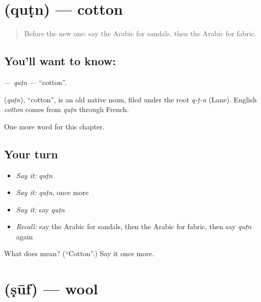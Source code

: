 \section[\texorpdfstring{\ar{قطن} (quṭn)}{قطن (quṭn)}]{ (quṭn) — cotton}

\label{lesson:AR-C214-qutn}



\begin{quote}
Before the new one: say the Arabic for sandals, then the Arabic for fabric.
\end{quote}

\subsection*{You'll want to know: }
\textbf{} — \emph{quṭn} — \textquotedblleft{}cotton\textquotedblright{}.

\begin{cousinweb}
\textbf{} (\emph{quṭn}), \textquotedblleft{}cotton\textquotedblright{}, is an old native noun, filed under the root \emph{q-ṭ-n} (Lane). English \emph{cotton} comes from \emph{quṭn} through French.
\end{cousinweb}

\begin{grammarlens}[title={What you've built}]
One more word for this chapter.
\end{grammarlens}

\subsection*{Your turn}
\begin{itemize}
\raggedright
  \item \emph{Say it:} \emph{quṭn}
  \item \emph{Say it:} \emph{quṭn}, once more
  \item \emph{Say it:} say \emph{quṭn}
  \item \emph{Recall:} say the Arabic for sandals, then the Arabic for fabric, then say \emph{quṭn} again
\end{itemize}

\begin{tcolorbox}[breakable,colback=teal!4,colframe=teal!35!black,title={Before you move on}]
What does  mean? (\textquotedblleft{}Cotton\textquotedblright{}.) Say it once more.
\end{tcolorbox}
\section[\texorpdfstring{\ar{صوف} (ṣūf)}{صوف (ṣūf)}]{ (ṣūf) — wool}

